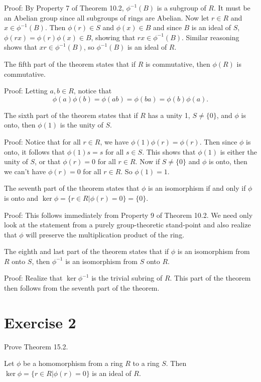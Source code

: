 \documentclass[12pt]{article}
\begin{document}
Proof: By Property 7 of Theorem 10.2, $\phi^{-1}(B)$ is a subgroup of $R$.  It must be an
Abelian group since all subgroups of rings are Abelian.  Now let $r\in R$ and $x\in\phi^{-1}(B)$.
Then $\phi(r)\in S$ and $\phi(x)\in B$ and since $B$ is an ideal of $S$, $\phi(rx)=\phi(r)\phi(x)\in B$,
showing that $rx\in\phi^{-1}(B)$.  Similar reasoning shows that $xr\in\phi^{-1}(B)$, so $\phi^{-1}(B)$
is an ideal of $R$.

The fifth part of the theorem states that if $R$ is commutative, then $\phi(R)$ is commutative.

Proof: Letting $a,b\in R$, notice that
\begin{equation*}
\phi(a)\phi(b)=\phi(ab)=\phi(ba)=\phi(b)\phi(a).
\end{equation*}

The sixth part of the theorem states that if $R$ has a unity 1, $S\neq\{0\}$, and $\phi$ is onto,
then $\phi(1)$ is the unity of $S$.

Proof: Notice that for all $r\in R$, we have $\phi(1)\phi(r)=\phi(r)$.  Then since $\phi$ is onto,
it follows that $\phi(1)s=s$ for all $s\in S$.  This shows that $\phi(1)$ is either the unity of $S$,
or that $\phi(r)=0$ for all $r\in R$.  Now if $S\neq\{0\}$ and $\phi$ is onto, then we can't
have $\phi(r)=0$ for all $r\in R$.  So $\phi(1)=1$.

The seventh part of the theorem states that $\phi$ is an isomorphism if and only if $\phi$ is onto and
$\ker\phi=\{r\in R|\phi(r)=0\}=\{0\}$.

Proof: This follows immediately from Property 9 of Theorem 10.2.  We need only look at the statement
from a purely group-theoretic stand-point and also realize that $\phi$ will preserve the multiplication
product of the ring.

The eighth and last part of the theorem states that if $\phi$ is an isomorphism from $R$ onto $S$,
then $\phi^{-1}$ is an isomorphism from $S$ onto $R$.

Proof: Realize that $\ker\phi^{-1}$ is the trivial subring of $R$.  This part of the theorem then
follows from the seventh part of the theorem.

\section*{Exercise 2}

Prove Theorem 15.2.

Let $\phi$ be a homomorphism from a ring $R$ to a ring $S$.  Then
$\ker\phi=\{r\in R|\phi(r)=0\}$ is an ideal of $R$.
\end{document}
